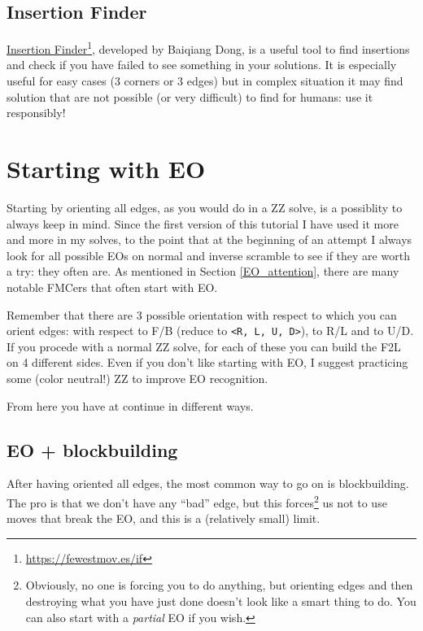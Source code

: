 \documentclass[11pt,a4paper]{book}
\newcommand{\m}{\texttt}
\begin{document}
\subsection{Insertion Finder}

\href{https://fewestmov.es/if}{Insertion Finder}\footnote{\url{https://fewestmov.es/if}}, developed by Baiqiang Dong, is a useful tool to find insertions and check if you have failed to see something in your solutions. %
It is especially useful for easy cases (3 corners or 3 edges) but in complex situation it may find solution that are not possible (or very difficult) to find for humans: use it responsibly!

\section{Starting with EO}
\label{eo}

Starting by orienting all edges, as you would do in a ZZ solve, is a possiblity to always keep in mind. Since the first version of this tutorial I have used it more and more in my solves, to the point that at the beginning of an attempt I always look for all possible EOs on normal and inverse scramble to see if they are worth a try: they often are. As mentioned in Section \ref{EO_attention}, there are many notable FMCers that often start with EO.

Remember that there are 3 possible orientation with respect to which you can orient edges: with respect to F/B (reduce to \m{<R, L, U, D>}), to R/L and to U/D. If you procede with a normal ZZ solve, for each of these you can build the F2L on 4 different sides. Even if you don't like starting with EO, I suggest practicing some (color neutral!) ZZ to improve EO recognition.

From here you have at continue in different ways.

\subsection{EO + blockbuilding} 

After having oriented all edges, the most common way to go on is blockbuilding. The pro is that we don't have any ``bad'' edge, but this forces\footnote{Obviously, no one is forcing you to do anything, but orienting edges and then destroying what you have just done doesn't look like a smart thing to do. You can also start with a \emph{partial} EO if you wish.} us not to use moves that break the EO, and this is a (relatively small) limit.
\end{document}
